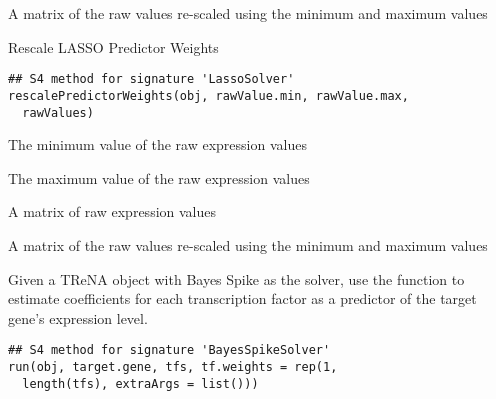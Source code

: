 \documentclass[a4paper]{book}
\begin{document}
%
\begin{Value}
A matrix of the raw values re-scaled using the minimum and maximum values
\end{Value}
%
\begin{Description}\relax
Rescale LASSO Predictor Weights
\end{Description}
%
\begin{Usage}
\begin{verbatim}
## S4 method for signature 'LassoSolver'
rescalePredictorWeights(obj, rawValue.min, rawValue.max,
  rawValues)
\end{verbatim}
\end{Usage}
%
\begin{Arguments}
\begin{ldescription}
\item[\code{rawValue.min}] The minimum value of the raw expression values

\item[\code{rawValue.max}] The maximum value of the raw expression values

\item[\code{rawValues}] A matrix of raw expression values
\end{ldescription}
\end{Arguments}
%
\begin{Value}
A matrix of the raw values re-scaled using the minimum and maximum values
\end{Value}
%
\begin{Description}\relax
Given a TReNA object with Bayes Spike as the solver, use the  function to estimate coefficients
for each transcription factor as a predictor of the target gene's expression level.
\end{Description}
%
\begin{Usage}
\begin{verbatim}
## S4 method for signature 'BayesSpikeSolver'
run(obj, target.gene, tfs, tf.weights = rep(1,
  length(tfs), extraArgs = list()))
\end{verbatim}
\end{Usage}
\end{document}
